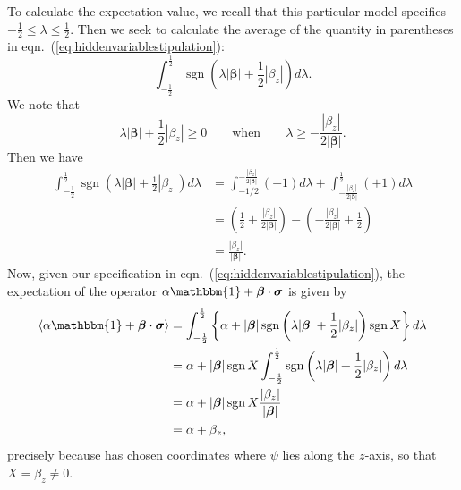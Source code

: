 \documentclass[12pt]{article}
\begin{document}
To calculate the expectation value, we recall that this particular model specifies $-\frac{1}{2} \le \lambda \le \frac{1}{2}$. Then we seek to calculate the average of the quantity in parentheses in eqn.~(\ref{eq:hiddenvariablestipulation}):
\begin{displaymath}
  \int_{-\frac{1}{2}}^{\frac{1}{2}} \operatorname{sgn} \left( \lambda|\bm{\beta}| + \frac{1}{2} |\beta_z| \right) d\lambda.
\end{displaymath}
We note that
\begin{displaymath}
  \lambda|\bm{\beta}| + \frac{1}{2} |\beta_z| \ge 0 \qquad \text{when} \qquad \lambda \ge -\frac{|\beta_z|}{2|\bm{\beta}|}.
\end{displaymath}
Then we have
\begin{displaymath}
  \begin{split}
    \int_{-\frac{1}{2}}^{\frac{1}{2}} \operatorname{sgn} \left( \lambda|\bm{\beta}| + \frac{1}{2} |\beta_z| \right) d\lambda
    &= \int_{-1/2}^{-\frac{|\beta_z|}{2|\bm{\beta}|}} (-1) d\lambda + \int_{-\frac{|\beta_z|}{2|\bm{\beta}|}}^{\frac{1}{2}} (+1) d\lambda \\
    &= \left( \frac{1}{2} + \frac{|\beta_z|}{2|\bm{\beta}|} \right) - \left( -\frac{|\beta_z|}{2|\bm{\beta}|} + \frac{1}{2} \right) \\
    &= \frac{|\beta_z|}{|\bm{\beta}|}.
  \end{split}
\end{displaymath}
Now, given our specification in eqn.~(\ref{eq:hiddenvariablestipulation}), the expectation of the operator $\alpha \mathbbm{1} + \bm{\beta} \cdot \bm{\sigma}$ is given by
\begin{displaymath}
  \begin{split}
    \langle \alpha \mathbbm{1} + \bm{\beta} \cdot \bm{\sigma} \rangle
    &= \int_{-\frac{1}{2}}^{\frac{1}{2}} \left\{ \alpha + |\bm{\beta}| \operatorname{sgn} \left( \lambda|\bm{\beta}| + \frac{1}{2} |\beta_z| \right) \operatorname{sgn} X \right\} d\lambda \\
    &= \alpha + |\bm{\beta}| \operatorname{sgn} X \int_{-\frac{1}{2}}^{\frac{1}{2}} \operatorname{sgn} \left( \lambda|\bm{\beta}| + \frac{1}{2} |\beta_z| \right) d\lambda \\
    &= \alpha + |\bm{\beta}| \operatorname{sgn} X \frac{|\beta_z|}{|\bm{\beta}|} \\
    &= \alpha + \beta_z,
  \end{split}
\end{displaymath}
precisely because \cite{Bell1966} has chosen coordinates where $\psi$ lies along the $z$-axis, so that $X = \beta_z \not= 0$.
\end{document}

